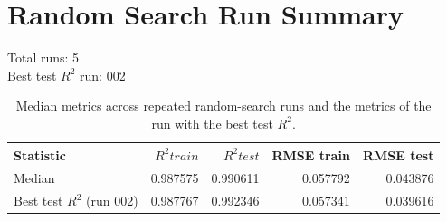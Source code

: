 \documentclass{article}
\begin{document}
\section*{Random Search Run Summary}
Total runs: 5\\
Best test $R^2$ run: 002\\
\begin{table}[ht]
\centering
\begin{tabular}{lrrrr}
\toprule
Statistic & $R^2 train$ & $R^2 test$ & RMSE train & RMSE test \\
\midrule
Median & 0.987575 & 0.990611 & 0.057792 & 0.043876 \\
Best test $R^2$ (run 002) & 0.987767 & 0.992346 & 0.057341 & 0.039616 \\
\bottomrule
\end{tabular}
\caption{Median metrics across repeated random-search runs and the metrics of the run with the best test $R^2$.}
\end{table}
\end{document}
